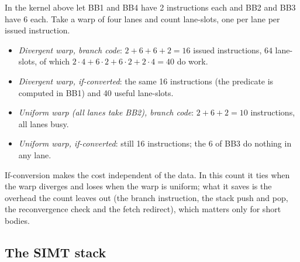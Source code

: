 \documentclass[../main.tex]{subfiles}
\begin{document}
\begin{example}
  \label{ex:l06-if-conversion}
  In the kernel above let BB1 and BB4 have 2 instructions each and BB2
  and BB3 have 6 each.  Take a warp of four lanes and count lane-slots,
  one per lane per issued instruction.
  \begin{itemize}
    \item \emph{Divergent warp, branch code}: $2+6+6+2 = 16$ issued
      instructions, $64$ lane-slots, of which $2\cdot4 + 6\cdot2 +
      6\cdot2 + 2\cdot4 = 40$ do work.
    \item \emph{Divergent warp, if-converted}: the same 16 instructions
      (the predicate is computed in BB1) and 40 useful lane-slots.
    \item \emph{Uniform warp (all lanes take BB2), branch code}:
      $2+6+2 = 10$ instructions, all lanes busy.
    \item \emph{Uniform warp, if-converted}: still 16 instructions; the
      6 of BB3 do nothing in any lane.
  \end{itemize}
  If-conversion makes the cost independent of the data.  In this
  count it ties when the warp diverges and loses when the warp is
  uniform; what it saves is the overhead the count leaves out (the
  branch instruction, the stack push and pop, the reconvergence check
  and the fetch redirect), which matters only for short bodies.
\end{example}

\subsection{The SIMT stack}
\label{sec:l06-simt-stack}
\end{document}
